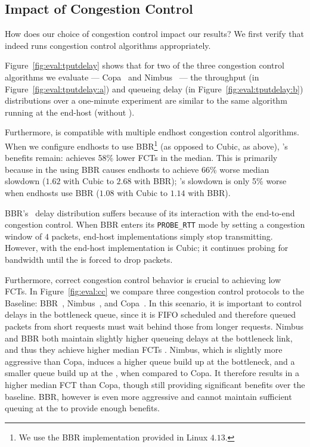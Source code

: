 \subsection{Impact of Congestion Control} \label{s:robust:cross}\label{s:eval:cc}
How does our choice of congestion control impact our results? 
We first verify that \name indeed runs congestion control algorithms appropriately.

Figure~\ref{fig:eval:tputdelay} shows that for two of the three congestion control algorithms we evaluate --- Copa~\cite{copa} and Nimbus~\cite{nimbus} --- the throughput (in Figure~\ref{fig:eval:tputdelay:a}) and queueing delay (in Figure~\ref{fig:eval:tputdelay:b}) distributions over a one-minute experiment are similar to the same algorithm running at the end-host (\ie without \name).

Furthermore, \name is compatible with multiple endhost congestion control algorithms.
When we configure endhosts to use BBR\footnote{We use the BBR implementation provided in Linux $4.13$.} (as opposed to Cubic, as above), \name's benefits remain: \name achieves 58\% lower FCTs in the median.
This is primarily because in the \baseline using BBR causes endhosts to achieve 66\% worse median slowdown ($1.62$ with Cubic to $2.68$ with BBR); \name's slowdown is only 5\% worse when endhosts use BBR ($1.08$ with Cubic to $1.14$ with BBR).

BBR's~\cite{bbr} delay distribution suffers because of its interaction with the end-to-end congestion control. When BBR enters its \texttt{PROBE\_RTT} mode by setting a congestion window of $4$ packets, end-host implementations simply stop transmitting.
However, with \name the end-host implementation is Cubic; it continues probing for bandwidth until the \inbox is forced to drop packets.

Furthermore, correct congestion control behavior is crucial to achieving low FCTs.
In Figure~\ref{fig:eval:cc} we compare three congestion control protocols to the Baseline: BBR~\cite{bbr}, Nimbus~\cite{nimbus}, and Copa~\cite{copa}.
In this scenario, it is important to control delays in the bottleneck queue, since it is FIFO scheduled and therefore queued packets from short requests must wait behind those from longer requests. Nimbus and BBR both maintain slightly higher queueing delays at the bottleneck link, and thus they achieve higher median FCTs . 
Nimbus, which is slightly more aggressive than Copa, induces a higher queue build up at the bottleneck, and a smaller queue build up at the \name, when compared to Copa. It therefore results in a higher median FCT than Copa, though still providing significant benefits over the baseline. 
BBR, however is even more aggressive and cannot maintain sufficient queuing at the \name to provide enough benefits.

